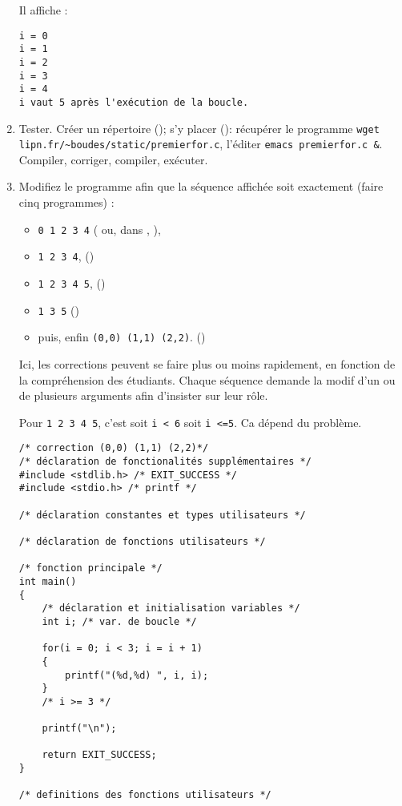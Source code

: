 \begin{enumerate}
\begin{correction}
Il affiche :
\begin{verbatim}
i = 0
i = 1
i = 2
i = 3
i = 4
i vaut 5 après l'exécution de la boucle.
\end{verbatim}
\end{correction}
\item Tester. Créer un répertoire ();
s'y placer (): récupérer le programme
\verb|wget lipn.fr/~boudes/static/premierfor.c|, l'éditer
\verb|emacs premierfor.c &|. Compiler,
corriger, compiler, exécuter.

\item Modifiez le programme afin que la séquence affichée soit
  exactement (faire cinq programmes) :
  \begin{itemize}
  \item \verb|0 1 2 3 4| ( ou, dans
    , ),
  \item \verb|1 2 3 4|, ()
  \item \verb|1 2 3 4 5|, ()
  \item \verb|1 3 5| ()
  \item puis, enfin \verb|(0,0) (1,1) (2,2)|. ()
  \end{itemize}
  \begin{correction}
    Ici, les corrections peuvent se faire plus ou moins rapidement, en
    fonction de la compréhension des étudiants. Chaque séquence
    demande la modif d'un ou de plusieurs arguments afin d'insister
    sur leur rôle.

Pour \verb|1 2 3 4 5|, c'est soit \verb|i < 6| soit \verb|i <=5|. Ca dépend du problème.
\begin{verbatim}
/* correction (0,0) (1,1) (2,2)*/
/* déclaration de fonctionalités supplémentaires */
#include <stdlib.h> /* EXIT_SUCCESS */
#include <stdio.h> /* printf */

/* déclaration constantes et types utilisateurs */

/* déclaration de fonctions utilisateurs */

/* fonction principale */
int main()
{
    /* déclaration et initialisation variables */
    int i; /* var. de boucle */

    for(i = 0; i < 3; i = i + 1)
    {
        printf("(%d,%d) ", i, i);
    }
    /* i >= 3 */

    printf("\n");

    return EXIT_SUCCESS;
}

/* definitions des fonctions utilisateurs */
\end{verbatim}


\end{correction}
\end{enumerate}
